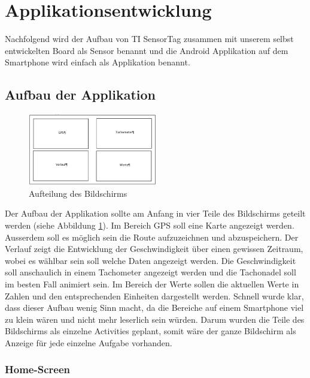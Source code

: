 \section{Applikationsentwicklung}
Nachfolgend wird der Aufbau von TI SensorTag zusammen mit unserem selbst entwickelten Board als Sensor benannt und die Android Applikation auf dem Smartphone wird einfach als Applikation benannt.

\subsection{Aufbau der Applikation}

\begin{figure}[ht]
    \includegraphics[width=0.5\textwidth]{3Vorgehen/imag/Aufbau_Applikation_erste_Version.png}
    \caption{Aufteilung des Bildschirms}\label{aufbau_applikation_1} 
\end{figure}

Der Aufbau der Applikation sollte am Anfang in vier Teile des Bildschirms geteilt werden (siehe Abbildung \ref{aufbau_applikation_1}). 
Im Bereich GPS soll eine Karte angezeigt werden. Ausserdem soll es möglich sein die Route aufzuzeichnen und abzuspeichern.
Der Verlauf zeigt die Entwicklung der Geschwindigkeit über einen gewissen Zeitraum, wobei es wählbar sein soll welche Daten angezeigt werden.
Die Geschwindigkeit soll anschaulich in einem Tachometer angezeigt werden und die Tachonadel soll im besten Fall animiert sein.
Im Bereich der Werte sollen die aktuellen Werte in Zahlen und den entsprechenden Einheiten dargestellt werden.
Schnell wurde klar, dass dieser Aufbau wenig Sinn macht, da die Bereiche auf einem Smartphone viel zu klein wären und nicht mehr leserlich sein würden. Darum wurden die Teile des Bildschirms als einzelne Activities geplant, somit wäre der ganze Bildschirm als Anzeige für jede einzelne Aufgabe vorhanden.

\subsubsection{Home-Screen}

